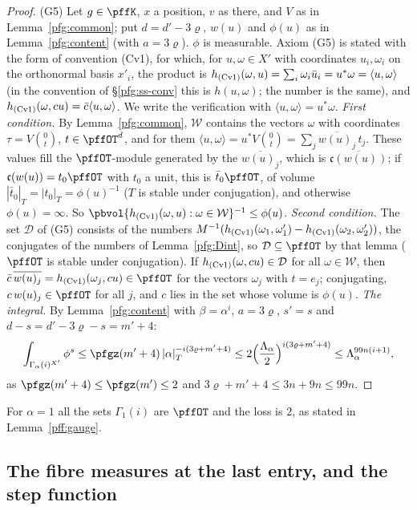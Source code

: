 \documentclass[10pt]{amsart}
\theoremstyle{definition}
\theoremstyle{remark}
\begin{document}
\begin{proof}
(G5) Let $g\in\pffK$, $x$ a position, $v$ as there, and $V$ as in Lemma~\ref{pfg:common}; put $d=d'-3\varrho$,
$w(u)$ and $\phi(u)$ as in Lemma~\ref{pfg:content} (with $a=3\varrho$). $\phi$ is measurable. Axiom (G5) is stated with
the form of convention (Cv1), for which, for $u,\omega\in X'$ with coordinates $u_i,\omega_i$ on the orthonormal basis
$x'_i$, the product is $h_{\rm (Cv1)}(\omega,u)=\sum_i\omega_i\bar u_i=u^*\omega=\langle u,\omega\rangle$ (in the convention of
\S\ref{pfg:ss-conv} this is $h(u,\omega)$; the number is the same), and $h_{\rm (Cv1)}(\omega,cu)=\bar c\langle u,\omega\rangle$. We
write the verification with $\langle u,\omega\rangle=u^*\omega$. \emph{First condition.} By Lemma~\ref{pfg:common}, $\mathcal W$
contains the vectors $\omega$ with coordinates $\tau=V\binom0t$, $t\in\pffOT^d$, and for them
$\langle u,\omega\rangle=u^*V\binom0t=\sum_j\overline{w(u)_j}\,t_j$. These values fill the $\pffOT$-module generated by the
$\overline{w(u)_j}$, which is $\overline{\mathfrak c(w(u))}$; if $\mathfrak c(w(u))=t_0\pffOT$ with $t_0$ a unit, this is $\bar t_0\pffOT$,
of volume $|\bar t_0|_T=|t_0|_T=\phi(u)^{-1}$ ($T$ is stable under conjugation), and otherwise $\phi(u)=\infty$. So
$\pbvol\{h_{\rm (Cv1)}(\omega,u):\omega\in\mathcal W\}^{-1}\le\phi(u)$. \emph{Second condition.} The set $\mathcal D$ of (G5) consists of
the numbers $M^{-1}(h_{\rm (Cv1)}(\omega_1,\omega_1')-h_{\rm (Cv1)}(\omega_2,\omega_2'))$, the conjugates of the numbers of
Lemma~\ref{pfg:Dint}, so $\mathcal D\subseteq\pffOT$ by that lemma ($\pffOT$ is stable under conjugation). If
$h_{\rm (Cv1)}(\omega,cu)\in\mathcal D$ for all $\omega\in\mathcal W$, then $\bar c\,\overline{w(u)_j}=h_{\rm (Cv1)}(\omega_j,cu)\in\pffOT$ for the
vectors $\omega_j$ with $t=e_j$; conjugating, $c\,w(u)_j\in\pffOT$ for all $j$, and $c$ lies in the set whose volume is $\phi(u)$. \emph{The integral.} By
Lemma~\ref{pfg:content} with $\beta=\alpha^i$, $a=3\varrho$, $s'=s$ and $d-s=d'-3\varrho-s=m'+4$:
\[
\int_{\Gamma_\alpha(i)^{X'}}\phi^s\le\pfgz(m'+4)\,|\alpha|_T^{-i(3\varrho+m'+4)}\le2\Bigl(\frac{\Lambda_\alpha}2\Bigr)^{i(3\varrho+m'+4)}
\le\Lambda_\alpha^{99n(i+1)},
\]
as $\pfgz(m'+4)\le\pfgz(m')\le2$ and $3\varrho+m'+4\le3n+9n\le99n$.
\end{proof}

For $\alpha=1$ all the sets $\Gamma_1(i)$ are $\pffOT$ and the loss is $2$, as stated in Lemma~\ref{pff:gauge}.

\subsection{The fibre measures at the last entry, and the step function}\label{pfg:ss-fibre}
\end{document}
